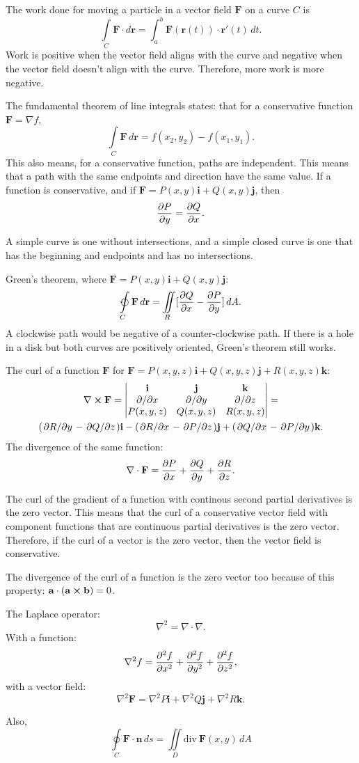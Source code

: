 \documentclass{article}
\begin{document}
The work done for moving a particle in a vector field $\mathbf{F}$ on a curve $C$ is
\[
\int \limits_C \mathbf{F} \cdot d\mathbf{r} = 
\int_a^b \mathbf{F}(\mathbf{r}(t)) \cdot \mathbf{r}'(t) \, dt.
\]
Work is positive when the vector field aligns with the curve and negative when
the vector field doesn't align with the curve. Therefore, more work is more negative. 

The fundamental theorem of line integrals states: 
that for a conservative function $\mathbf{F} = \nabla f$,
\[
\int \limits_C \mathbf{F} \, d\mathbf{r} = f(x_2, y_2) - f(x_1, y_1).
\]
This also means, for a conservative function, paths are independent.
This means that a path with the same endpoints and direction
have the same value. If a function is conservative,
and if $\mathbf{F} = P(x,y)\mathbf{i} + Q(x,y)\mathbf{j}$, then
\[
\pdv{P}{y} = \pdv{Q}{x}.
\]

A simple curve is one without intersections,
and a simple closed curve is one that has the beginning and endpoints
and has no intersections.

Green's theorem, where $\mathbf{F} = P(x,y)\mathbf{i} + Q(x,y)\mathbf{j}$:
\[
\varointctrclockwise \limits_C \mathbf{F} \, d\mathbf{r} =
\iint \limits_R [\pdv{Q}{x} - \pdv{P}{y}] \, dA.
\]
A clockwise path would be negative of a counter-clockwise path.
If there is a hole in a disk but both curves are positively oriented,
Green's theorem still works.

The curl of a function $\mathbf{F}$ for 
$\mathbf{F} = P(x,y,z)\mathbf{i} + Q(x,y,z)\mathbf{j} + R(x,y,z)\mathbf{k}$:
\begin{gather}
    \nabla \cross \mathbf{F} = 
    \begin{vmatrix}
        \mathbf{i} & \mathbf{j} & \mathbf{k} \\ 
        \pdv*{}{x} & \pdv*{}{y} & \pdv*{}{z} \\ 
        P(x,y,z) & Q(x,y,z) & R(x,y,z)
    \end{vmatrix} = \nonumber \\
    (\pdv*{R}{y} - \pdv*{Q}{z})\mathbf{i} -
    (\pdv*{R}{x} - \pdv*{P}{z})\mathbf{j} + 
    (\pdv*{Q}{x} - \pdv*{P}{y})\mathbf{k} \nonumber.
\end{gather}
The divergence of the same function: 
\[
\nabla \cdot \mathbf{F} = \pdv{P}{x} + \pdv{Q}{y} + \pdv{R}{z}.
\]

The curl of the gradient of a function with continous second partial derivatives
is the zero vector. This means that the curl of a conservative vector field 
with component functions that are continuous partial derivatives is the zero vector. 
Therefore, if the curl of a vector is the zero vector, then the vector field is conservative.

The divergence of the curl of a function is the zero vector too because of this property:
$\mathbf{a \cdot (a \cross b)} = 0$.

The Laplace operator: 
\[
\nabla^2 = \nabla \cdot \nabla.
\]
With a function:
\[
\nabla^2 f = \pdv[2]{f}{x} + \pdv[2]{f}{y} + \pdv[2]{f}{z},
\]
with a vector field: 
\[
\nabla^2 \mathbf{F} = \nabla^2 P \mathbf{i} + \nabla^2 Q \mathbf{j} + \nabla^2 R \mathbf{k}.
\]

Also,
\[
\oint \limits_C \mathbf{F \cdot n} \, ds = \iint \limits_D \mbox{div} \ \mathbf{F}(x,y) \, dA
\]
\end{document}
